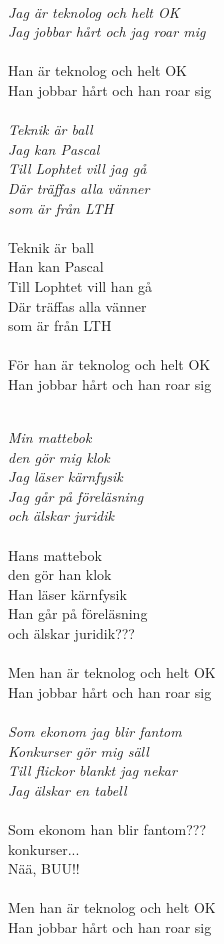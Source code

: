 \noindent\textit{\\Jag är teknolog och helt OK\\
Jag jobbar hårt och jag roar mig}\\\\
\noindent Han är teknolog och helt OK\\
Han jobbar hårt och han roar sig\\\\
\noindent\textit{Teknik är ball\\
Jag kan Pascal\\
Till Lophtet vill jag gå\\
Där träffas alla vänner\\
som är från LTH}\\\\
\noindent Teknik är ball\\
Han kan Pascal\\
Till Lophtet vill han gå\\
Där träffas alla vänner\\
som är från LTH\\\\
\noindent För han är teknolog och helt OK\\
Han jobbar hårt och han roar sig\\\\


\newpage
\resetBackground

\noindent\textit{Min mattebok \\
den gör mig klok\\
Jag läser kärnfysik\\
Jag går på föreläsning\\
och älskar juridik}\\\\
\noindent Hans mattebok\\
den gör han klok\\
Han läser kärnfysik\\
Han går på föreläsning\\
och älskar juridik???\\\\
\noindent Men han är teknolog och helt OK\\
Han jobbar hårt och han roar sig\\\\
\noindent\textit{Som ekonom jag blir fantom\\
Konkurser gör mig säll\\
Till flickor blankt jag nekar\\
Jag älskar en tabell}\\\\
\noindent Som ekonom han blir fantom???\\
konkurser...\\
Nää, BUU!!\\\\
\noindent Men han är teknolog och helt OK\\
Han jobbar hårt och han roar sig\\


